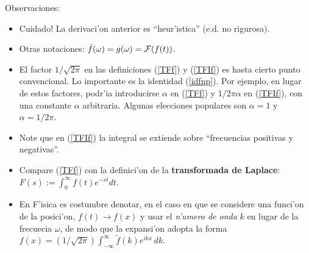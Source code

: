Observaciones:

\begin{itemize}
\item Cuidado! La derivaci'on anterior es ``heur'istica'' (e.d. no rigurosa). 
\item Otras notaciones: $\tilde{f}(\omega)=g(\omega)={\cal F}(f(t))$.
\item El factor $1/\sqrt{2\pi}$ en las definiciones (\ref{TFf}) y (\ref{TFIf}) es hasta cierto punto convencional. Lo importante es la identidad (\ref{idfnp}). Por ejemplo, en lugar de estos factores, podr'ia introducirse $\alpha$ en (\ref{TFf}) y $1/2\pi\alpha$ en (\ref{TFIf}), con una constante $\alpha$ arbitraria. Algunas elecciones populares son $\alpha=1$ y $\alpha=1/2\pi$.
\item Note que en (\ref{TFIf}) la integral se extiende sobre ``frecuencias positivas y negativas''.
\item Compare (\ref{TFf}) con la definici'on de la \textbf{transformada de Laplace}: $F(s):=\int_0^\infty f(t)e^{-st}dt$.
\item En F'isica es costumbre denotar, en el caso en que se considere una funci'on de la posici'on, $f(t)\to f(x)$ y usar el \textit{n'umero de onda} $k$ en lugar de la frecuecia $\omega$, de modo que la expansi'on adopta la forma $f(x)=(1/\sqrt{2\pi})\int_{-\infty}^\infty\tilde{f}(k) e^{ikx} \,dk.$
\end{itemize}

